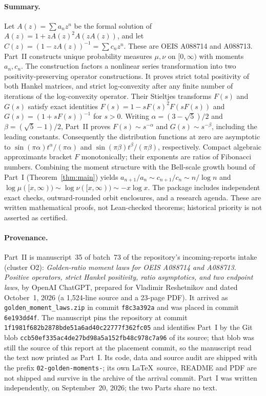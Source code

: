 \documentclass[11pt]{article}
\numberwithin{equation}{section}
\theoremstyle{definition}
\theoremstyle{remark}
\begin{document}
\paragraph{Summary.}
Let $A(z)=\sum a_nz^n$ be the formal solution of
$A(z)=1+zA(z)^2A(zA(z))$, and let $C(z)=(1-zA(z))^{-1}=\sum c_nz^n$.
These are OEIS A088714 and A088713. Part~II constructs unique probability
measures $\mu,\nu$ on $[0,\infty)$ with moments $a_n,c_n$. The construction
factors a nonlinear series transformation into two positivity-preserving
operator constructions. It proves strict total positivity of both Hankel
matrices, and strict log-convexity after any finite number of iterations of
the log-convexity operator.
Their Stieltjes transforms $F(s)$ and $G(s)$ satisfy exact identities
$F(s)=1-sF(s)^2F(sF(s))$ and $G(s)=(1+sF(s))^{-1}$ for $s>0$.
Writing $\alpha=(3-\sqrt5)/2$ and $\beta=(\sqrt5-1)/2$, Part~II proves
$F(s)\sim s^{-\alpha}$ and $G(s)\sim s^{-\beta}$, including the leading
constants. Consequently the distribution functions at zero are asymptotic
to $\sin(\pi\alpha)t^\alpha/(\pi\alpha)$ and
$\sin(\pi\beta)t^\beta/(\pi\beta)$, respectively. Compact algebraic
approximants bracket $F$ monotonically; their exponents are ratios of
Fibonacci numbers.
Combining the moment structure with the Bell-scale growth bound of Part~I
(Theorem~\ref{thm:main}) yields $a_{n+1}/a_n\sim c_{n+1}/c_n\sim n/\log n$
and $\log\mu([x,\infty))\sim\log\nu([x,\infty))\sim-x\log x$.
The package includes independent exact checks, outward-rounded orbit
enclosures, and a research agenda. These are written mathematical proofs,
not Lean-checked theorems; historical priority is not asserted as certified.

\paragraph{Provenance.}
Part~II is manuscript~35 of batch~73 of the repository's incoming-reports
intake (cluster O2): \emph{Golden-ratio moment laws for OEIS A088714 and
A088713. Positive operators, strict Hankel positivity, ratio asymptotics,
and two endpoint laws}, by OpenAI ChatGPT, prepared for Vladimir
Reshetnikov and dated October~1, 2026 (a 1{,}524-line source and a
23-page PDF). It arrived as \texttt{golden\_moment\_laws.zip} in commit
\texttt{f8c3a392a} and was placed in commit \texttt{6e193dd4f}. The
manuscript pins the repository at commit
\texttt{1f1981f682b2878bde51a6ad40c22777f362fc05} and identifies Part~I by
the Git blob \texttt{ccb50ef335ac4de27bd98a5a152fb48c978c7a96} of its
source; that blob was still the source of this report at the placement
commit, so the manuscript read the text now printed as Part~I. Its code,
data and source audit are shipped with the prefix
\texttt{02-golden-moments-}; its own \LaTeX\ source, README and PDF are not
shipped and survive in the archive of the arrival commit. Part~I was
written independently, on September~20, 2026; the two Parts share no text.
\end{document}
